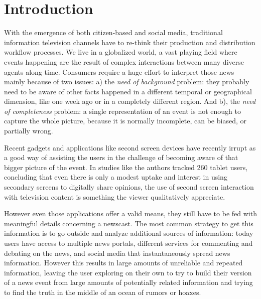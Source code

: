 \documentclass{llncs}
\newcommand{\todo}[1]{\colorbox{red}{#1}}
\begin{document}

\section{Introduction}
\label{sec:introduction}

With the emergence of both citizen-based and social media, traditional information television channels have to re-think their production and distribution workflow processes. We live in a globalized world, a vast playing field where events happening are the result of complex interactions between many diverse agents along time. Consumers require a huge effort to interpret those news mainly because of two issues: a) the \textit{need of background} problem: they probably need to be aware of other facts happened in a different temporal or geographical dimension, like one week ago or in a completely different region. And b), the \textit{need of completeness} problem: a single representation of an event is not enough to capture the whole picture, because it is normally incomplete, can be biased, or partially wrong. 

Recent gadgets and applications like second screen devices have recently irrupt as a good way of assisting the users in the challenge of becoming aware of that bigger picture of the event. In studies like \cite{Courtois2012} the authors tracked 260 tablet users, concluding that even there is only a modest uptake and interest in using secondary screens to digitally share opinions, the use of second screen interaction with television content is something the viewer qualitatively appreciate.

However even those applications offer a valid means, they still have to be fed with meaningful details concerning a newscast. The most common strategy to get this information is to go outside and analyze additional sources of information: today users have access to multiple news portals, different services for commenting and debating on the news, and social media that instantaneously spread news information. However this results in large amounts of unreliable and repeated information, leaving the user exploring on their own to try to build their version of a news event from large amounts of potentially related information and trying to find the truth in the middle of an ocean of rumors or hoaxes.
\end{document}
